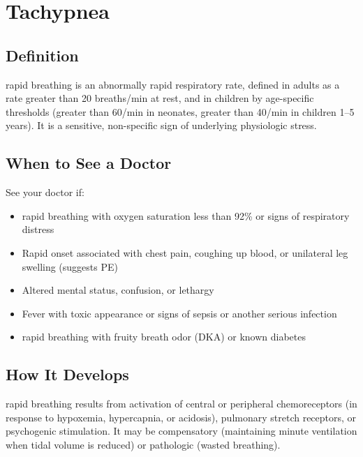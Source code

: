 \chapter{Tachypnea}

\section*{Definition}
rapid breathing is an abnormally rapid respiratory rate, defined in adults as a rate greater than 20 breaths/min at rest, and in children by age-specific thresholds (greater than 60/min in neonates, greater than 40/min in children 1--5 years). It is a sensitive, non-specific sign of underlying physiologic stress.

\section*{When to See a Doctor}
See your doctor if:
\begin{itemize}
  \item rapid breathing with oxygen saturation less than 92\% or signs of respiratory distress
  \item Rapid onset associated with chest pain, coughing up blood, or unilateral leg swelling (suggests PE)
  \item Altered mental status, confusion, or lethargy
  \item Fever with toxic appearance or signs of sepsis or another serious infection
  \item rapid breathing with fruity breath odor (DKA) or known diabetes
\end{itemize}

\section*{How It Develops}
rapid breathing results from activation of central or peripheral chemoreceptors (in response to hypoxemia, hypercapnia, or acidosis), pulmonary stretch receptors, or psychogenic stimulation. It may be compensatory (maintaining minute ventilation when tidal volume is reduced) or pathologic (wasted breathing).

